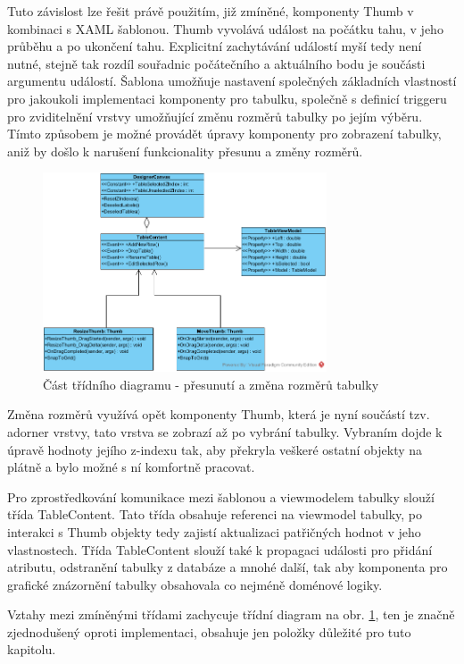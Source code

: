 \documentclass[czech,bachelor,public,dept460,male,oneside]{diploma}
\begin{document}
		Tuto závislost lze řešit právě použitím, již zmíněné, komponenty Thumb v kombinaci s XAML šablonou. Thumb vyvolává událost na počátku tahu, v jeho průběhu a po ukončení tahu. Explicitní zachytávání událostí myší tedy není nutné, stejně tak rozdíl souřadnic počátečního a aktuálního bodu je součásti argumentu událostí. Šablona umožňuje nastavení společných základních vlastností pro jakoukoli implementaci komponenty pro tabulku, společně s definicí triggeru pro zviditelnění vrstvy umožňující změnu rozměrů tabulky po jejím výběru. Tímto způsobem je možné provádět úpravy komponenty pro zobrazení tabulky, aniž by došlo k narušení funkcionality přesunu a změny rozměrů. 
		
		\begin{figure}[!h]
			\centering
			\includegraphics[width=0.75\textwidth]{Figures/EditorTabulky}
			\caption{Část třídního diagramu - přesunutí a změna rozměrů tabulky}
			\label{fig:classDiagResize}
		\end{figure}
		
		Změna rozměrů využívá opět komponenty Thumb, která je nyní součástí tzv. adorner vrstvy, tato vrstva se zobrazí až po vybrání tabulky. Vybraním dojde k úpravě hodnoty jejího z-indexu tak, aby překryla veškeré ostatní objekty na plátně a bylo možné s ní komfortně pracovat. 
		
		Pro zprostředkování komunikace mezi šablonou a viewmodelem tabulky slouží třída TableContent. Tato třída obsahuje referenci na viewmodel tabulky, po interakci s Thumb objekty tedy zajistí aktualizaci patřičných hodnot v jeho vlastnostech. Třída TableContent slouží také k propagaci události pro přidání atributu, odstranění tabulky z databáze a mnohé další, tak aby komponenta pro grafické znázornění tabulky obsahovala co nejméně doménové logiky.
		
		Vztahy mezi zmíněnými třídami zachycuje třídní diagram na obr. \ref{fig:classDiagResize}, ten je značně zjednodušený oproti implementaci, obsahuje jen položky důležité pro tuto kapitolu.
		
\end{document}
